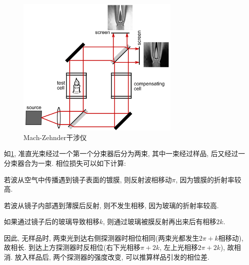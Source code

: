 \documentclass{ctexart}
\begin{document}
\begin{figure}[ht]
    \centering
    \includegraphics[width=8cm]{src/MachZehnderInterferometer.png}
    \caption{Mach-Zehnder干涉仪}
    \label{fig:mach_zehnder干涉仪}
\end{figure}
如\cref{fig:mach_zehnder干涉仪}, 准直光束经过一个第一个分束器后分为两束, 其中一束经过样品, 后又经过一分束器合为一束. 相位损失可以如下计算:
\begin{cenum}
    \item 若波从空气中传播遇到镜子表面的镀膜, 则反射波相移动$\pi$, 因为镀膜的折射率较高.
    \item 若波从镜子内部遇到薄膜后反射, 则不发生相移, 因为玻璃的折射率较高.
    \item 如果通过镜子后的玻璃导致相移$k$, 则通过玻璃被膜反射再出来后有相移$2k$.
\end{cenum}
因此, 无样品时, 两束光到达右侧探测器时相位相同(两束光都发生$2\pi + k$相移动), 故相长. 到达上方探测器时反相位(右下光相移$\pi+2k$, 左上光相移$2\pi+2k$), 故相消. 放入样品后, 两个探测器的强度改变, 可以推算样品引发的相位差.


\end{document}
